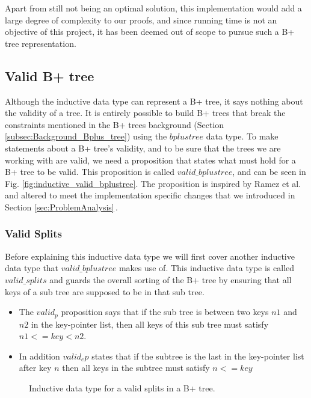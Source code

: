 Apart from still not being an optimal solution, this implementation would add a large degree of complexity to our proofs, and since running time is not an objective of this project, it has been deemed out of scope to pursue such a B+ tree representation.


\subsection{Valid B+ tree}
\label{subsec:Valid_bplustree}
Although the inductive data type can represent a B+ tree, it says nothing about the validity of a tree. It is entirely possible to build B+ trees that break the constraints mentioned in the B+ trees background (Section \ref{subsec:Background_Bplus_tree}) using the $bplustree$ data type. To make statements about a B+ tree's validity, and to be sure that the trees we are working with are valid, we need a proposition that states what must hold for a B+ tree to be valid. This proposition is called $valid\_bplustree$, and can be seen in Fig. \ref{fig:inductive_valid_bplustree}. The proposition is inspired by Ramez et al. and altered to meet the implementation specific changes that we introduced in Section \ref{sec:ProblemAnalysis}\,\cite[pp. 652]{Elmasri1999}. 
\subsubsection{Valid Splits}
Before explaining this inductive data type we will first cover another inductive data type that $valid\_bplustree$ makes use of. This inductive data type is called $valid\_splits$ and guards the overall sorting of the B+ tree by ensuring that all keys of a sub tree are supposed to be in that sub tree.
\begin{itemize}
	\item The $valid_p$ proposition says that if the sub tree is between two keys $n1$ and $n2$ in the key-pointer list, then all keys of this sub tree must satisfy $n1 <= key < n2$. 
	\item In addition $valid_ep$ states that if the subtree is the last in the key-pointer list after key $n$ then all keys in the subtree must satisfy $n <= key$
\end{itemize} 

\begin{figure}

\caption{Inductive data type for a valid splits in a B+ tree.}
\label{fig:inductive_valid_splits}
\end{figure}

